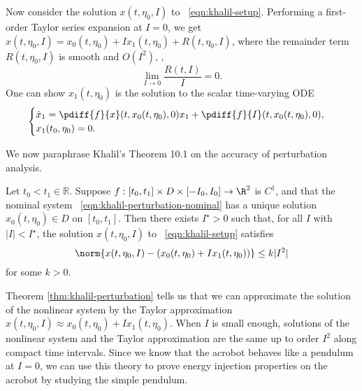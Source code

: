 Now consider the solution \(x(t,\eta_0,I)\) to ~\eqref{eqn:khalil-setup}.
Performing a first-order Taylor series expansion at \(I = 0\), we get
\(x(t,\eta_0,I) = x_0(t,\eta_0) + I x_1(t,\eta_0) + R(t,\eta_0,I)\), where the
remainder term \(R(t,\eta_0,I)\) is smooth and \(O(I^2)\), \ie,
\[
    \lim \limits_{I \to 0} \frac{R(t,I)}{I} = 0
    .
\]
One can show \(x_1(t,\eta_0)\) is the solution to the scalar time-varying ODE
\begin{equation}\label{eqn:khalil-perturbation-firstorder}
    \begin{cases}
        \dot{x}_1 = \pdiff{f}{x}(t,x_0(t,\eta_0),0)x_1 + \pdiff{f}{I}(t,x_0(t,\eta_0),0)
        , \\
        x_1(t_0,\eta_0) = 0
        .
    \end{cases}
\end{equation}

We now paraphrase Khalil's Theorem 10.1 \cite{khalil_nonlinear} on the
accuracy of perturbation analysis.
\begin{thm}\label{thm:khalil-perturbation}
    Let \(t_0 < t_1 \in \mathbb{R}\).
    Suppose \(f : [t_0,t_1] \times D \times [-I_0,I_0] \rightarrow \R^2\) is
    \(C^1\), and that the nominal system
    ~\eqref{eqn:khalil-perturbation-nominal} has a unique solution
    \(x_0(t,\eta_0) \in D\) on \([t_0,t_1]\).
    Then there exists \(I^\star > 0\) such that, for all \(I\) with 
    \(|I| < I^\star\), the solution \(x(t,\eta_0,I)\) to
    ~\eqref{eqn:khalil-setup} satisfies
    \[
        \norm{x(t,\eta_0,I) - \left(x_0(t,\eta_0) + I x_1(t,\eta_0)\right)} \leq k |I^2|
    \]
    for some \(k > 0\).
\end{thm}

Theorem \ref{thm:khalil-perturbation} tells us that we can approximate the
solution of the nonlinear system by the Taylor approximation 
\(x(t,\eta_0,I) \approx x_0(t,\eta_0) + I x_1(t,\eta_0)\).
When \(I\) is small enough, solutions of the nonlinear system and
the Taylor approximation are the same up to order \(I^2\) along compact time
intervals.
Since we know that the acrobot behaves like a pendulum at \(I = 0\), we can
use this theory to prove energy injection properties on the acrobot by studying
the simple pendulum.
 
